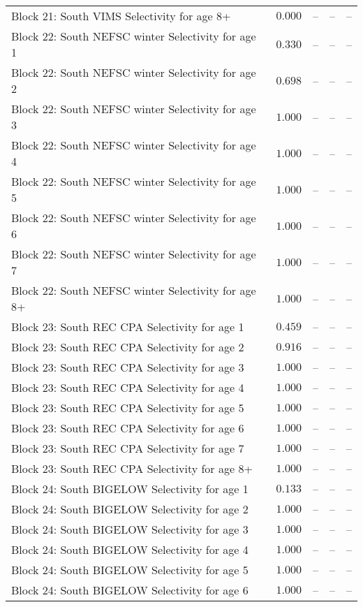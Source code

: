 \documentclass[
]{article}
\begin{document}
\begin{landscape}
\begin{longtable}[t]{lrrrr}
Block 21: South VIMS Selectivity for age 8+ & $0.000$ & -- & -- & --\\
\addlinespace
Block 22: South NEFSC winter Selectivity for age 1 & $0.330$ & -- & -- & --\\
Block 22: South NEFSC winter Selectivity for age 2 & $0.698$ & -- & -- & --\\
Block 22: South NEFSC winter Selectivity for age 3 & $1.000$ & -- & -- & --\\
Block 22: South NEFSC winter Selectivity for age 4 & $1.000$ & -- & -- & --\\
Block 22: South NEFSC winter Selectivity for age 5 & $1.000$ & -- & -- & --\\
\addlinespace
Block 22: South NEFSC winter Selectivity for age 6 & $1.000$ & -- & -- & --\\
Block 22: South NEFSC winter Selectivity for age 7 & $1.000$ & -- & -- & --\\
Block 22: South NEFSC winter Selectivity for age 8+ & $1.000$ & -- & -- & --\\
Block 23: South REC CPA Selectivity for age 1 & $0.459$ & -- & -- & --\\
Block 23: South REC CPA Selectivity for age 2 & $0.916$ & -- & -- & --\\
\addlinespace
Block 23: South REC CPA Selectivity for age 3 & $1.000$ & -- & -- & --\\
Block 23: South REC CPA Selectivity for age 4 & $1.000$ & -- & -- & --\\
Block 23: South REC CPA Selectivity for age 5 & $1.000$ & -- & -- & --\\
Block 23: South REC CPA Selectivity for age 6 & $1.000$ & -- & -- & --\\
Block 23: South REC CPA Selectivity for age 7 & $1.000$ & -- & -- & --\\
\addlinespace
Block 23: South REC CPA Selectivity for age 8+ & $1.000$ & -- & -- & --\\
Block 24: South BIGELOW Selectivity for age 1 & $0.133$ & -- & -- & --\\
Block 24: South BIGELOW Selectivity for age 2 & $1.000$ & -- & -- & --\\
Block 24: South BIGELOW Selectivity for age 3 & $1.000$ & -- & -- & --\\
Block 24: South BIGELOW Selectivity for age 4 & $1.000$ & -- & -- & --\\
\addlinespace
Block 24: South BIGELOW Selectivity for age 5 & $1.000$ & -- & -- & --\\
Block 24: South BIGELOW Selectivity for age 6 & $1.000$ & -- & -- & --\\

\end{longtable}
\end{landscape}
\end{document}
